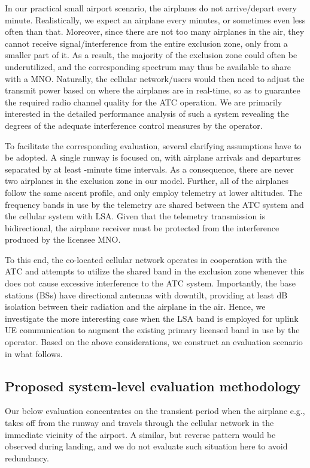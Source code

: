 \documentclass[journal]{IEEEtran}
\begin{document}
In our practical small airport scenario, the airplanes do not arrive/depart every minute. Realistically, we expect an airplane every  minutes, or sometimes even less often than that. Moreover, since there are not too many airplanes in the air, they cannot receive signal/interference from the entire exclusion zone, only from a smaller part of it. As a result, the majority of the exclusion zone could often be underutilized, and the corresponding spectrum may thus be available to share with a MNO. Naturally, the cellular network/users would then need to adjust the transmit power based on where the airplanes are in real-time, so as to guarantee the required radio channel quality for the ATC operation. We are primarily interested in the detailed performance analysis of such a system revealing the degrees of the adequate interference control measures by the operator.

To facilitate the corresponding evaluation, several clarifying assumptions have to be adopted. A single runway is focused on, with airplane arrivals and departures separated by at least -minute time intervals. As a consequence, there are never two airplanes in the exclusion zone in our model. Further, all of the airplanes follow the same ascent profile, and only employ telemetry at lower altitudes. The frequency bands in use by the telemetry are shared between the ATC system and the cellular system with LSA. Given that the telemetry transmission is bidirectional, the airplane receiver must be protected from the interference produced by the licensee MNO. 

To this end, the co-located cellular network operates in cooperation with the ATC and attempts to utilize the shared band in the exclusion zone whenever this does not cause excessive interference to the ATC system. Importantly, the base stations (BSs) have directional antennas with downtilt, providing at least  dB isolation between their radiation and the airplane in the air. Hence, we investigate the more interesting case when the LSA band is employed for uplink UE communication to augment the existing primary licensed band in use by the operator. Based on the above considerations, we construct an evaluation scenario in what follows.

\subsection{Proposed system-level evaluation methodology}

Our below evaluation concentrates on the transient period when the airplane e.g., takes off from the runway and travels through the cellular network in the immediate vicinity of the airport. A similar, but reverse pattern would be observed during landing, and we do not evaluate such situation here to avoid redundancy.
\end{document}
